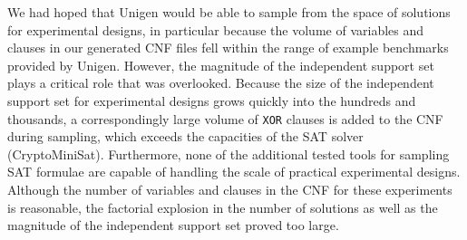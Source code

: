 We had hoped that Unigen would be able to sample from the space of solutions for experimental designs, in particular because the volume of variables and clauses in our generated CNF files fell within the range of example benchmarks provided by Unigen. However, the magnitude of the independent support set plays a critical role that was overlooked. Because the size of the independent support set for experimental designs grows quickly into the hundreds and thousands, a correspondingly large volume of \texttt{XOR} clauses is added to the CNF during sampling, which exceeds the capacities of the SAT solver (CryptoMiniSat). Furthermore, none of the additional tested tools for sampling SAT formulae are capable of handling the scale of practical experimental designs. Although the number of variables and clauses in the CNF for these experiments is reasonable, the factorial explosion in the number of solutions as well as the magnitude of the independent support set proved too large.
